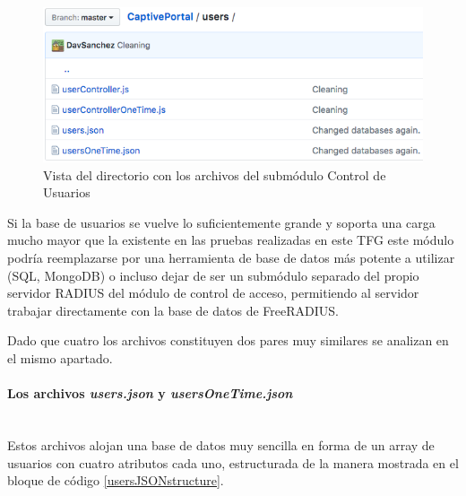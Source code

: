 \begin{figure}[!t]
\begin{center}
\includegraphics[width=0.75\linewidth]{./5_AnalisisOrganico/Img/usersDir.png}
\end{center}
\caption{Vista del directorio con los archivos del submódulo Control de Usuarios}
\label{usersDir}
\end{figure}

Si la base de usuarios se vuelve lo suficientemente grande y soporta una carga mucho mayor que la existente en las pruebas realizadas en este TFG este módulo podría reemplazarse por una herramienta de base de datos más potente a utilizar (SQL, MongoDB) o incluso dejar de ser un submódulo separado del propio servidor RADIUS del módulo de control de acceso, permitiendo al servidor trabajar directamente con la base de datos de FreeRADIUS.

Dado que cuatro los archivos constituyen dos pares muy similares se analizan en el mismo apartado.

\paragraph{Los archivos \emph{users.json} y \emph{usersOneTime.json}} \label{usersJSONFiles} ~\\

Estos archivos alojan una base de datos muy sencilla en forma de un array de usuarios con cuatro atributos cada uno, estructurada de la manera mostrada en el bloque de código \ref{usersJSONstructure}.


